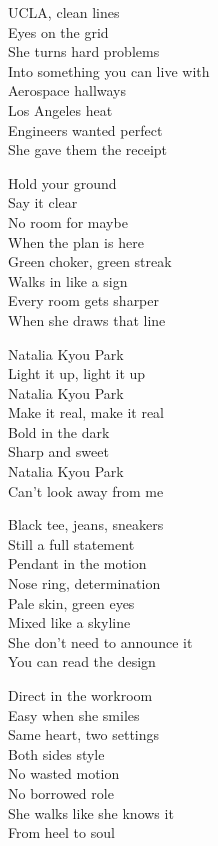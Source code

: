 \begin{lyrics}
UCLA, clean lines\\
Eyes on the grid\\
She turns hard problems\\
Into something you can live with\\
Aerospace hallways\\
Los Angeles heat\\
Engineers wanted perfect\\
She gave them the receipt

Hold your ground\\
Say it clear\\
No room for maybe\\
When the plan is here\\
Green choker, green streak\\
Walks in like a sign\\
Every room gets sharper\\
When she draws that line

Natalia Kyou Park\\
Light it up, light it up\\
Natalia Kyou Park\\
Make it real, make it real\\
Bold in the dark\\
Sharp and sweet\\
Natalia Kyou Park\\
Can’t look away from me

Black tee, jeans, sneakers\\
Still a full statement\\
Pendant in the motion\\
Nose ring, determination\\
Pale skin, green eyes\\
Mixed like a skyline\\
She don’t need to announce it\\
You can read the design

Direct in the workroom\\
Easy when she smiles\\
Same heart, two settings\\
Both sides style\\
No wasted motion\\
No borrowed role\\
She walks like she knows it\\
From heel to soul


\end{lyrics}
